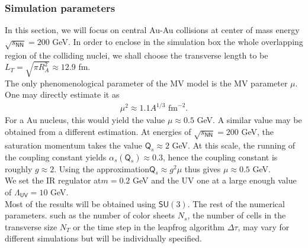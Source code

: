 \subsubsection*{Simulation parameters}
In this section, we will focus on central {\sffamily Au-Au} collisions at center of mass energy $\sqrt{s_{\textsf{NN}}}=200$ GeV. In order to enclose in the simulation box the whole overlapping region of the colliding nuclei, we shall choose the transverse length to be$L_T=\sqrt{\pi R_A^2}\approx 12.9$ fm. \\
The only phenomenological parameter of the {\sffamily MV} model is the {\sffamily MV} parameter $\mu$. One may directly estimate it as
\begin{align*}
    \mu^{2} \approx 1.1 A^{1 / 3} \text{ fm}^{-2}.
\end{align*}
For a {\sffamily Au} nucleus, this would yield the value $\mu\approx 0.5$ GeV. A similar value may be obtained from a different estimation. At energies of $\sqrt{s_{\textsf{NN}}}=200$ GeV, the saturation momentum takes the value \cite{iancuven} $\textsf{Q}_s\approx 2$ GeV. At this scale, the running of the coupling constant yields $\alpha_s(\textsf{Q}_s)\approx 0.3$, hence the coupling constant is roughly $g\approx 2$. Using the approximation$\textsf{Q}_s\approx g^2\mu$ thus gives $\mu\approx 0.5$ GeV. \\
We set the {\sffamily IR} regulator at$m=0.2$ GeV and the {\sffamily UV} one at a large enough value of $\Lambda_{\textsf{UV}}=10$ GeV. \\
Most of the results will be obtained using $\textsf{SU}(3)$. The rest of the numerical parameters. such as the number of color sheets $N_s$, the number of cells in the transverse size $N_T$ or the time step in the leapfrog algorithm $\Delta \tau$, may vary for different simulations but will be individually specified.

